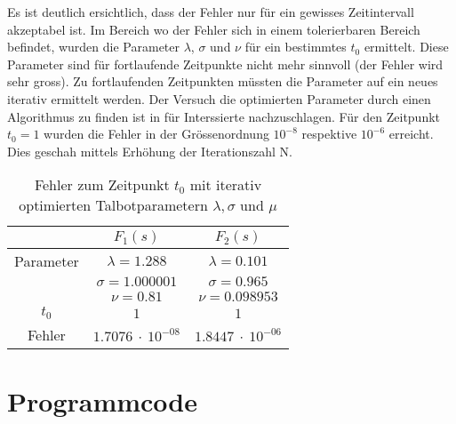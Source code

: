 

Es ist deutlich ersichtlich, dass der Fehler nur für ein gewisses
Zeitintervall akzeptabel ist. Im Bereich wo der Fehler sich in einem
tolerierbaren Bereich befindet, wurden die Parameter $\lambda$,
$\sigma$ und $\nu$ für ein bestimmtes $t_{0}$ ermittelt.
Diese Parameter sind für fortlaufende Zeitpunkte nicht mehr sinnvoll (der Fehler wird sehr gross). Zu fortlaufenden Zeitpunkten müssten die Parameter auf ein neues iterativ ermittelt werden. Der Versuch die optimierten Parameter durch einen Algorithmus zu finden ist in \cite{laplace:talbot} für Interssierte nachzuschlagen. 
Für den Zeitpunkt $t_{0}=1$ wurden die Fehler in der Grössenordnung $10^{-8}$ respektive $10^{-6}$ erreicht. 
Dies geschah mittels Erhöhung der Iterationszahl N.

\begin{table}
\centering
\begin{tabular}[c]{c|c|c}
& $F_{1}(s)$ & $F_{2}(s)$ \\
\hline
Parameter & $\lambda=1.288$ & $\lambda=0.101$ \\
 & $\sigma=1.000001$ & $\sigma=0.965$ \\
 & $\nu=0.81$ & $\nu=0.098953$ \\
\hline
$t_{0}$ & $1$ & $1$ \\
\hline
Fehler & $1.7076~\cdot~10^{-08}$ & $1.8447~\cdot~10^{-06}$ \\
\end{tabular}
\caption{Fehler zum Zeitpunkt $t_{0}$ mit iterativ optimierten Talbotparametern $\lambda, \sigma$ und $\mu$
\label{laplace:parametertabelle2}}
\end{table}


%
%
%
%
%
%

\FloatBarrier
\section{Programmcode\label{laplace:section:programmcode}}

